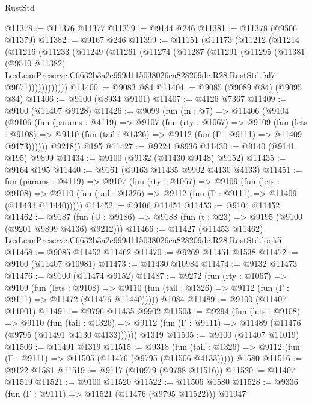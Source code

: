 \begin{lexlean}{RustStd}
\begin{coremodule}
@11378 := @11376 @11377
@11379 := @9144 @246
@11381 := @11378 (@9506 @11379)
@11382 := @9167 @246
@11399 := @11151
    (@11173
      (@11212
        (@11214
          (@11216
            (@11233
              (@11249
                (@11261
                  (@11274
                    (@11287
                      (@11291
                        (@11295
                          (@11381
                            (@9510 @11382)
                            LexLeanPreserve.C6632b3a2e999d115038026ca828209de.R28.RustStd.fal7
                            @9671))))))))))))
@11400 := @9083 @84
@11404 := @9085 (@9089 @84) (@9095 @84)
@11406 := @9100 (@8934 @9101)
@11407 := @4126 @7367
@11409 := @9100 (@11407 @9128)
@11426 := @9099
    (fun (fn : @7) =>
    @11406
      (@9104
        (@9106
          (fun (params : @4119) =>
          @9107
            (fun (rty : @1067) =>
            @9109
              (fun (lets : @9108) =>
              @9110 (fun (tail : @1326) => @9112 (fun (Γ : @9111) => @11409 @9173))))))
        @9218))
    @195
@11427 := @9224 @8936
@11430 := @9140 (@9141 @195) @9899
@11434 := @9100 (@9132 (@11430 @9148) @9152)
@11435 := @9164 @195
@11440 := @9161 (@9163 @11435 @9902 @4130 @4133)
@11451 := fun (params : @4119) =>
  @9107
    (fun (rty : @1067) =>
    @9109
      (fun (lets : @9108) =>
      @9110 (fun (tail : @1326) => @9112 (fun (Γ : @9111) => @11409 (@11434 @11440)))))
@11452 := @9106 @11451
@11453 := @9104 @11452
@11462 := @9187
    (fun (U : @9186) => @9188 (fun (t : @23) => @9195 (@9100 (@9201 @9899 @4136) @9212)))
@11466 := @11427 (@11453 @11462) LexLeanPreserve.C6632b3a2e999d115038026ca828209de.R28.RustStd.look5
@11468 := @9085 @11452 @11462
@11470 := @9269 @11451 @1538
@11472 := @9100 (@11407 @10981)
@11473 := @11430 @10984
@11474 := @9132 @11473
@11476 := @9100 (@11474 @9152)
@11487 := @9272
    (fun (rty : @1067) =>
    @9109
      (fun (lets : @9108) =>
      @9110 (fun (tail : @1326) => @9112 (fun (Γ : @9111) => @11472 (@11476 @11440)))))
    @1084
@11489 := @9100 (@11407 @11001)
@11491 := @9796 @11435 @9902
@11503 := @9294
    (fun (lets : @9108) =>
    @9110
      (fun (tail : @1326) =>
      @9112 (fun (Γ : @9111) => @11489 (@11476 (@9795 (@11491 @4130 @4133))))))
    @1319
@11505 := @9100 (@11407 @11019)
@11506 := @11491 @1319
@11515 := @9318
    (fun (tail : @1326) => @9112 (fun (Γ : @9111) => @11505 (@11476 (@9795 (@11506 @4133)))))
    @1580
@11516 := @9122 @1581
@11519 := @9117 (@10979 (@9788 @11516))
@11520 := @11407 @11519
@11521 := @9100 @11520
@11522 := @11506 @1580
@11528 := @9336 (fun (Γ : @9111) => @11521 (@11476 (@9795 @11522))) @11047

\end{coremodule}
\end{lexlean}

